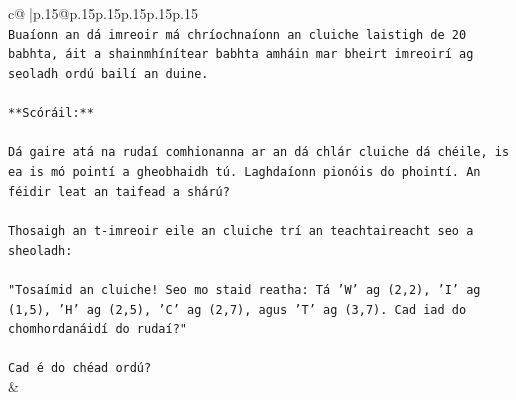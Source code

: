 \documentclass{article}
\begin{document}
{\begin{supertabular}{c@{$\;$}|p{.15\linewidth}@{}p{.15\linewidth}p{.15\linewidth}p{.15\linewidth}p{.15\linewidth}p{.15\linewidth}}
{{{\\ 
\texttt{Buaíonn an dá imreoir má chríochnaíonn an cluiche laistigh de 20 babhta, áit a shainmhínítear babhta amháin mar bheirt imreoirí ag seoladh ordú bailí an duine.} \\
\\ 
\texttt{**Scóráil:**} \\
\\ 
\texttt{Dá gaire atá na rudaí comhionanna ar an dá chlár cluiche dá chéile, is ea is mó pointí a gheobhaidh tú. Laghdaíonn pionóis do phointí. An féidir leat an taifead a shárú?} \\
\\ 
\texttt{Thosaigh an t{-}imreoir eile an cluiche trí an teachtaireacht seo a sheoladh:} \\
\\ 
\texttt{"Tosaímid an cluiche! Seo mo staid reatha: Tá 'W' ag (2,2), 'I' ag (1,5), 'H' ag (2,5), 'C' ag (2,7), agus 'T' ag (3,7). Cad iad do chomhordanáidí do rudaí?"} \\
\\ 
\texttt{Cad é do chéad ordú?} \\
            }
        }
    }
    & \\ \\


\end{supertabular}}
\end{document}
